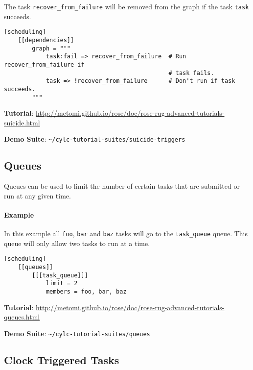 The task \lstinline{recover_from_failure} will be removed from the graph if
the task \lstinline{task} succeeds.

\begin{lstlisting}
[scheduling]
    [[dependencies]]
        graph = """
            task:fail => recover_from_failure  # Run recover_from_failure if
                                               # task fails.
            task => !recover_from_failure      # Don't run if task succeeds.
        """
\end{lstlisting}

\begin{shaded*}
\textbf{Tutorial}: \url{http://metomi.github.io/rose/doc/rose-rug-advanced-tutorials-suicide.html}

\textbf{Demo Suite}: \lstinline=~/cylc-tutorial-suites/suicide-triggers=
\end{shaded*}

\subsection{Queues}

Queues can be used to limit the number of certain tasks that are submitted or
run at any given time.

\paragraph*{Example}

In this example all \lstinline{foo}, \lstinline{bar} and \lstinline{baz} tasks
will go to the \lstinline{task_queue} queue. This queue will only allow two
tasks to run at a time.

\begin{lstlisting}
[scheduling]
    [[queues]]
        [[[task_queue]]]
            limit = 2
            members = foo, bar, baz
\end{lstlisting}

\begin{shaded*}
\textbf{Tutorial}: \url{http://metomi.github.io/rose/doc/rose-rug-advanced-tutorials-queues.html}

\textbf{Demo Suite}: \lstinline=~/cylc-tutorial-suites/queues=
\end{shaded*}

\subsection{Clock Triggered Tasks}
\label{Clock Triggered Tasks}

